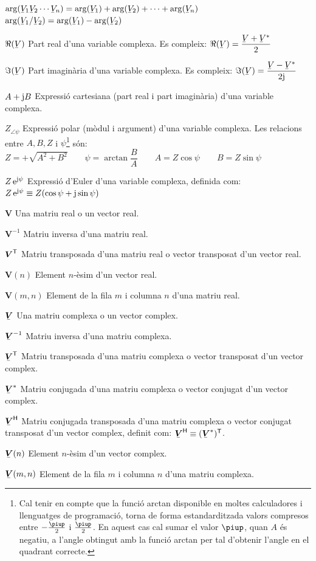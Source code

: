 \begin{list}{}
      $\arg(\cmplx{V}_1 \cmplx{V}_2 \cdots \cmplx{V}_n) = \arg(\cmplx{V}_1) + \arg (\cmplx{V}_2) + \cdots + \arg(\cmplx{V}_n)$\\[1ex]
      $\arg(\cmplx{V}_1 / \cmplx{V}_2) = \arg(\cmplx{V}_1) - \arg (\cmplx{V}_2)$
    \item[$\Re(\cmplx{V})$] Part real d'una variable complexa. Es compleix: $\Re(\cmplx{V}) = \dfrac{\cmplx{V} + \cmplx{V}^*}{2}$
    \item[$\Im(\cmplx{V})$] Part imagin\`{a}ria d'una variable complexa. Es compleix: $\Im(\cmplx{V}) = \dfrac{\cmplx{V} - \cmplx{V}^*}{2 \ju}$
    \item[$A+\mathrm{j} B$] Expressi\'{o} cartesiana (part real i part
    imagin\`{a}ria) d'una variable complexa.
    \item[$Z_{\angle \psi}$] Expressi\'{o} polar (m\`{o}dul i argument) d'una variable
    complexa. Les relacions entre $A, B, Z$ i $\psi$\footnote{Cal tenir en compte que la funci\'{o} \textsf{arctan} disponible en moltes calculadores i llenguatges de programaci\'{o}, torna de forma estandarditzada valors compresos entre $-\frac{\piup}{2}$ i $\frac{\piup}{2}$. En aquest cas cal sumar el valor $\piup$, quan $A$ \'{e}s negatiu, a l'angle obtingut amb la funci\'{o} \textsf{arctan} per tal d'obtenir l'angle en el quadrant correcte.} s\'{o}n:\\[1ex]
    $Z=+\sqrt{A^2+B^2}\quad\quad\psi=\arctan{\dfrac{B}{A}}\quad\quad
    A=Z\cos\psi\quad\quad B=Z\sin\psi$
    \item[$Z\,\mathrm{e}^{\mathrm{j}\psi}$] Expressi\'{o} d'Euler d'una variable complexa, definida com:
     $Z\,\mathrm{e}^{\mathrm{j}\psi} \equiv Z(\cos\psi+\mathrm{j}\sin\psi)$
    \item[$\boldsymbol{V}$] Una matriu real o un vector real.
    \item[$\boldsymbol{V}^{-1}$] Matriu inversa d'una matriu real.
    \item[$\boldsymbol{V}^\mathrm{\textsf{T}}$] Matriu transposada d'una matriu real o vector
    transposat d'un vector real.
    \item[$\boldsymbol{V}(n)$] Element $n$-\`{e}sim d'un vector real.
    \item[$\boldsymbol{V}(m,n)$] Element de la fila $m$ i columna $n$ d'una matriu real.
    \item[$\mcmplx{V}$] Una matriu complexa o un vector complex.
    \item[$\mcmplx{V}^{-1}$] Matriu inversa d'una matriu complexa.
    \item[$\transp{\mcmplx{V}}$] Matriu transposada d'una matriu complexa o vector
    transposat d'un vector complex.
    \item[$\mcmplx{V}^*$] Matriu conjugada d'una matriu complexa o vector
    conjugat d'un vector complex.
    \item[$\hermit{V}$] Matriu conjugada transposada d'una matriu complexa o vector
    conjugat transposat d'un vector complex, definit com: $\hermit{V} \equiv
    \transp{(\mcmplx{V}^*)}$.
    \item[$\mcmplx{V}(n)$] Element $n$-\`{e}sim d'un vector complex.
    \item[$\mcmplx{V}(m,n)$] Element de la fila $m$ i columna $n$ d'una matriu complexa.
\end{list}

